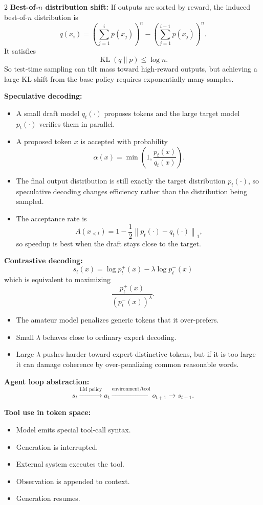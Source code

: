 \documentclass[10pt]{article}
\newcommand{\KL}{\operatorname{KL}}
\begin{document}
\begin{multicols*}{2}
\textbf{Best-of-\(n\) distribution shift:}
If outputs are sorted by reward, the induced best-of-\(n\) distribution is
\[
q(x_i)=
\left(\sum_{j=1}^i p(x_j)\right)^n
-
\left(\sum_{j=1}^{i-1} p(x_j)\right)^n.
\]
It satisfies
\[
\KL(q\|p)\le \log n.
\]
So test-time sampling can tilt mass toward high-reward outputs, but achieving a large KL shift from the base policy requires exponentially many samples.

\textbf{Speculative decoding:}
\begin{itemize}
\item A small draft model \(q_t(\cdot)\) proposes tokens and the large target model \(p_t(\cdot)\) verifies them in parallel.
\item A proposed token \(x\) is accepted with probability
\[
\alpha(x)=\min\left(1,\frac{p_t(x)}{q_t(x)}\right).
\]
\item The final output distribution is still exactly the target distribution \(p_t(\cdot)\), so speculative decoding changes efficiency rather than the distribution being sampled.
\item The acceptance rate is
\[
A(x_{<t})=1-\frac{1}{2}\left\lVert p_t(\cdot)-q_t(\cdot)\right\rVert_1,
\]
so speedup is best when the draft stays close to the target.
\end{itemize}

\textbf{Contrastive decoding:}
\[
s_t(x)=\log p_t^+(x)-\lambda \log p_t^-(x)
\]
which is equivalent to maximizing
\[
\frac{p_t^+(x)}{(p_t^-(x))^\lambda}.
\]
\begin{itemize}
\item The amateur model penalizes generic tokens that it over-prefers.
\item Small \(\lambda\) behaves close to ordinary expert decoding.
\item Large \(\lambda\) pushes harder toward expert-distinctive tokens, but if it is too large it can damage coherence by over-penalizing common reasonable words.
\end{itemize}

\textbf{Agent loop abstraction:}
\[
s_t
\xrightarrow{\text{LM policy}}
a_t
\xrightarrow{\text{environment/tool}}
o_{t+1}
\rightarrow
s_{t+1}.
\]

\textbf{Tool use in token space:}
\begin{itemize}
\item Model emits special tool-call syntax.
\item Generation is interrupted.
\item External system executes the tool.
\item Observation is appended to context.
\item Generation resumes.
\end{itemize}


\end{multicols*}
\end{document}
